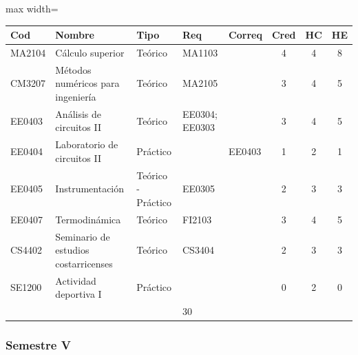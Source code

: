 \begin{center}
\small
\begin{adjustbox}{max width=\textwidth}
\begin{tabular}{|>{\RaggedRight\arraybackslash}p{1.25cm}|>{\RaggedRight\arraybackslash}p{5.2cm}|>{\RaggedRight\arraybackslash}p{1.65cm}|p{1.25cm}|p{1.25cm}|c|c|c|}
\hline
\rowcolor{grisEncabezado}
Cod & Nombre & Tipo & Req & Correq & Cred & HC & HE \\ \hline
MA2104 & Cálculo superior & Teórico & MA1103 &  & 4 & 4 & 8 \\ \hline
\rowcolor{azulTabla}
CM3207 & Métodos numéricos para ingeniería & Teórico & MA2105 &  & 3 & 4 & 5 \\ \hline
EE0403 & Análisis de circuitos II & Teórico & EE0304; EE0303 &  & 3 & 4 & 5 \\ \hline
\rowcolor{azulTabla}
EE0404 & Laboratorio de circuitos II & Práctico &  & EE0403 & 1 & 2 & 1 \\ \hline
EE0405 & Instrumentación & Teórico - Práctico & EE0305 &  & 2 & 3 & 3 \\ \hline
\rowcolor{azulTabla}
EE0407 & Termodinámica & Teórico & FI2103 &  & 3 & 4 & 5 \\ \hline
CS4402 & Seminario de estudios costarricenses & Teórico & CS3404 &  & 2 & 3 & 3 \\ \hline
\rowcolor{azulTabla}
SE1200 & Actividad deportiva I & Práctico &  &  & 0 & 2 & 0 \\ \hline
\multicolumn{5}{|l|}{Total} & 18 & 26 & 30 \\ \hline
\end{tabular}
\end{adjustbox}
\end{center}

\subsubsection*{Semestre V}

